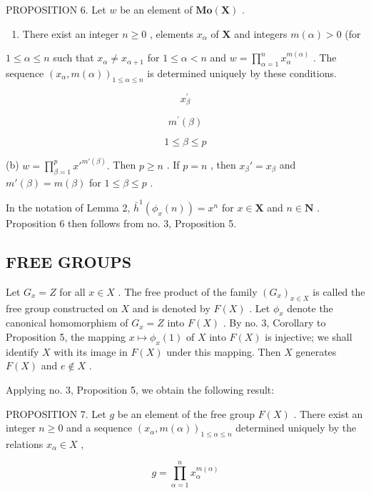 PROPOSITION 6. Let \(w\) be an element of \(\mathbf{Mo}(\mathbf{X})\) .

\begin{enumerate}
\def\labelenumi{(\alph{enumi})}
\tightlist
\item
  There exist an integer \(n \geqslant 0\) , elements \(x_{\alpha}\) of \(\mathbf{X}\) and integers \(m(\alpha) > 0\) (for
\end{enumerate}

\(1 \leqslant \alpha \leqslant n\) such that \(x_{\alpha} \neq x_{\alpha + 1}\) for \(1 \leqslant \alpha < n\) and \(w = \prod_{\alpha = 1}^{n} x_{\alpha}^{m(\alpha)}\) . The sequence \((x_{\alpha}, m(\alpha))_{1 \leqslant \alpha \leqslant n}\) is determined uniquely by these conditions.

\[
x _ {\beta} ^ {\prime}
\]

\[
m ^ {\prime} (\beta)
\]

\[
1 \leqslant \beta \leqslant p
\]

(b) \(w = \prod_{\beta=1}^{p} x'^{m'(\beta)}.\) Then \(p \geqslant n\) . If \(p = n\) , then \(x_{\beta}' = x_{\beta}\) and \(m'(\beta) = m(\beta)\) for \(1 \leqslant \beta \leqslant p\) .

In the notation of Lemma 2, \(\bar{h}^{1}(\phi_x(n)) = x^n\) for \(x \in \mathbf{X}\) and \(n \in \mathbf{N}\) . Proposition 6 then follows from no. 3, Proposition 5.

\subsection{FREE GROUPS}

Let \(G_x = Z\) for all \(x \in X\) . The free product of the family \((G_x)_{x \in X}\) is called the free group constructed on \(X\) and is denoted by \(F(X)\) . Let \(\phi_x\) denote the canonical homomorphism of \(G_x = Z\) into \(F(X)\) . By no. 3, Corollary to Proposition 5, the mapping \(x \mapsto \phi_x(1)\) of \(X\) into \(F(X)\) is injective; we shall identify \(X\) with its image in \(F(X)\) under this mapping. Then \(X\) generates \(F(X)\) and \(e \notin X\) .

Applying no. 3, Proposition 5, we obtain the following result:

PROPOSITION 7. Let \(g\) be an element of the free group \(F(X)\) . There exist an integer \(n \geqslant 0\) and a sequence \((x_{\alpha}, m(\alpha))_{1 \leqslant \alpha \leqslant n}\) determined uniquely by the relations \(x_{\alpha} \in X\) ,

\[
g = \prod_ {\alpha = 1} ^ {n} x _ {\alpha} ^ {m (\alpha)}
\]

